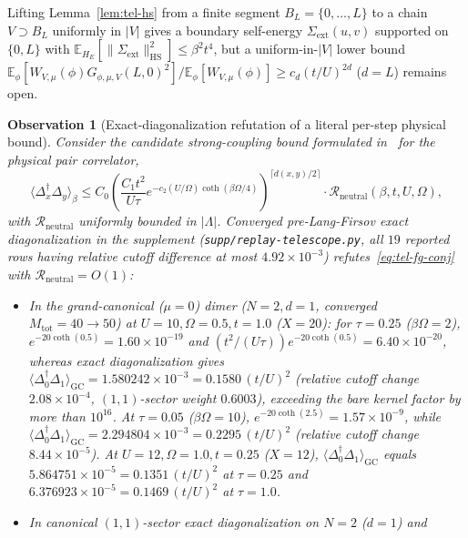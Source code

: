 \documentclass[11pt]{article}
\newtheorem{observation}[theorem]{Observation}
\theoremstyle{definition}
\theoremstyle{remark}
\newcommand{\E}{\mathbb{E}}
\newcommand{\Dop}{\Delta}
\begin{document}
Lifting Lemma~\ref{lem:tel-hs} from a finite segment $B_L = \{0,\dots,L\}$ to
a chain $V \supset B_L$ uniformly in $|V|$ gives a boundary self-energy
$\Sigma_{\mathrm{ext}}(u,v)$ supported on $\{0,L\}$ with
$\E_{H_E}[\|\Sigma_{\mathrm{ext}}\|_{\mathrm{HS}}^2] \le \beta^2 t^4$, but a
uniform-in-$|V|$ lower bound
$\E_\phi[W_{V,\mu}(\phi) G_{\phi,\mu,V}(L,0)^2] / \E_\phi[W_{V,\mu}(\phi)] \ge c_d (t/U)^{2d}$
($d=L$) remains open.

\begin{observation}[Exact-diagonalization refutation of a literal per-step physical bound]
\label{obs:tel-ed}
Consider the candidate strong-coupling bound formulated in~\cite{barriers3}
for the physical pair correlator,
\begin{equation}
\label{eq:tel-fg-conj}
\langle \Dop_x^\dagger \Dop_y \rangle_\beta
\le C_0 \left(\frac{C_1 t^2}{U\tau} e^{-c_2 (U/\Omega)\coth(\beta\Omega/4)}\right)^{\lceil d(x,y)/2 \rceil}
  \cdot \mathcal{R}_{\mathrm{neutral}}(\beta, t, U, \Omega),
\end{equation}
with $\mathcal{R}_{\mathrm{neutral}}$ uniformly bounded in $|\Lambda|$. Converged
pre-Lang-Firsov exact diagonalization in the supplement
(\texttt{supp/replay-telescope.py}, all $19$ reported rows having relative
cutoff difference at most $4.92 \times 10^{-3}$) refutes~\eqref{eq:tel-fg-conj}
with $\mathcal{R}_{\mathrm{neutral}} = O(1)$:
\begin{itemize}[leftmargin=1.5em]
\item In the grand-canonical ($\mu=0$) dimer ($N=2, d=1$, converged $M_{\mathrm{tot}} = 40 \to 50$)
at $U=10, \Omega=0.5, t=1.0$ ($X = 20$): for $\tau = 0.25$ ($\beta\Omega = 2$),
$e^{-20\coth(0.5)} = 1.60 \times 10^{-19}$ and
$(t^2/(U\tau)) e^{-20\coth(0.5)} = 6.40 \times 10^{-20}$, whereas exact
diagonalization gives $\langle \Dop_0^\dagger \Dop_1 \rangle_{\mathrm{GC}} = 1.580242 \times 10^{-3} = 0.1580\,(t/U)^2$
(relative cutoff change $2.08 \times 10^{-4}$, $(1,1)$-sector weight $0.6003$),
exceeding the bare kernel factor by more than $10^{16}$. At $\tau = 0.05$
($\beta\Omega = 10$), $e^{-20\coth(2.5)} = 1.57 \times 10^{-9}$, while
$\langle \Dop_0^\dagger \Dop_1 \rangle_{\mathrm{GC}} = 2.294804 \times 10^{-3} = 0.2295\,(t/U)^2$
(relative cutoff change $8.44 \times 10^{-5}$). At $U=12, \Omega=1.0, t=0.25$
($X=12$), $\langle \Dop_0^\dagger \Dop_1 \rangle_{\mathrm{GC}}$ equals
$5.864751 \times 10^{-5} = 0.1351\,(t/U)^2$ at $\tau=0.25$ and
$6.376923 \times 10^{-5} = 0.1469\,(t/U)^2$ at $\tau=1.0$.
\item In canonical $(1,1)$-sector exact diagonalization on $N=2$ ($d=1$) and

\end{itemize}
\end{observation}
\end{document}
